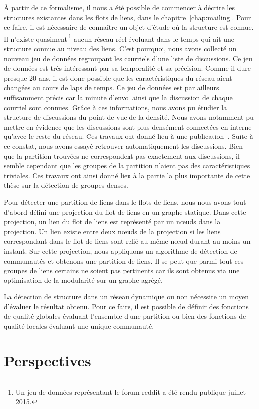 \`A partir de ce formalisme, il nous a été possible de commencer à décrire les structures existantes dans les flots de liens, dans le chapitre~\ref{chap:mailing}.
Pour ce faire, il est nécessaire de connaître un objet d'étude où la structure est connue.
Il n'existe quasiment\,\footnote{Un jeu de données représentant le forum reddit a été rendu publique juillet 2015.} aucun réseau réel évoluant dans le temps qui ait une structure connue au niveau des liens.
C'est pourquoi, nous avons collecté un nouveau jeu de données regroupant les courriels d'une liste de discussions.
Ce jeu de données est très intéressant par sa temporalité et sa précision.
Comme il dure presque 20 ans, il est donc possible que les caractéristiques du réseau aient changées au cours de laps de temps.
Ce jeu de données est par ailleurs suffisamment précis car la minute d’envoi ainsi que la discussion de chaque courriel sont connues.
Grâce à ces informations, nous avons pu étudier la structure de discussions du point de vue de la densité.
Nous avons notamment pu mettre en évidence que les discussions sont plus densément connectées en interne qu'avec le reste du réseau.
Ces travaux ont donné lieu à une publication~\cite{Gaumont2016}.
Suite à ce constat, nous avons essayé retrouver automatiquement les discussions.
Bien que la partition trouvées ne correspondent pas exactement aux discussions, il semble cependant que les groupes de la partition n'aient pas des caractéristiques triviales.
Ces travaux ont ainsi donné lieu à la partie la plus importante de cette thèse sur la détection de groupes denses.

Pour détecter une partition de liens dans le flots de liens, nous nous avons tout d'abord défini une projection du flot de liens en un graphe statique.
Dans cette projection, un lien du flot de liens est représenté par un n\oe uds dans la projection.
Un lien existe entre deux n\oe uds de la projection si les liens correspondant dans le flot de liens sont relié au même n\oe ud durant au moins un instant.
Sur cette projection, nous appliquons un algorithme de détection de communautés et obtenons une partition de liens.
Il se peut que parmi tout ces groupes de liens certains ne soient pas pertinents car ils sont obtenus via une optimisation de la modularité sur un graphe agrégé.


La détection de structure dans un réseau dynamique ou non nécessite un moyen d'évaluer le résultat obtenu.
Pour ce faire, il est possible de définir des fonctions de qualité globales évaluant l'ensemble d'une partition ou bien des fonctions de qualité locales évaluant une unique communauté.




\section{Perspectives}